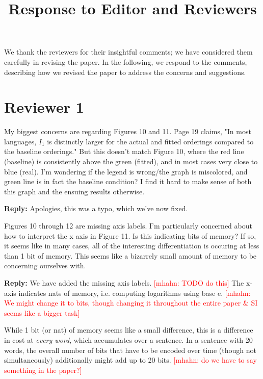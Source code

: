 \documentclass{article}[11pt,a4paper,oneside]
\title{Response to Editor and Reviewers}
\newcommand\mhahn[1]{\textcolor{red}{[mhahn: #1]}}
\newenvironment{reply}
  {\par\medskip
   \color{blue}%
   \begin{framed}
   \textbf{Reply: }\ignorespaces}
 {\end{framed}
  \medskip}
\begin{document}
\maketitle

We thank the reviewers for their insightful comments; we have considered them carefully in revising the paper. In the following, we respond to the comments, describing how we revised the paper to address the concerns and suggestions.



\section{Reviewer 1}



My biggest concerns are regarding Figures 10 and 11. Page 19 claims, "In most languages, $I_1$ is distinctly larger for the actual and fitted orderings compared to the baseline orderings." But this doesn't match Figure 10, where the red line (baseline) is consistently above the green (fitted), and in most cases very close to blue (real). I'm wondering if the legend is wrong/the graph is miscolored, and green line is in fact the baseline condition? I find it hard to make sense of both this graph and the ensuing results otherwise.

\begin{reply}
Apologies, this was a typo, which we've now fixed.
\end{reply}

Figures 10 through 12 are missing axis labels. I'm particularly concerned about how to interpret the x axis in Figure 11. Is this indicating bits of memory? If so, it seems like in many cases, all of the interesting differentiation is occuring at less than 1 bit of memory. This seems like a bizarrely small amount of memory to be concerning ourselves with.

\begin{reply}
We have added the missing axis labels. \mhahn{TODO do this}
The x-axis indicates nats of memory, i.e. computing logarithms using base e.
	\mhahn{We might change it to bits, though changing it throughout the entire paper \& SI seems like a bigger task}

	While 1 bit (or nat) of memory seems like a small difference, this is a difference in cost at \emph{every word}, which accumulates over a sentence.
	In a sentence with 20 words, the overall number of bits that have to be encoded over time (though not simultaneously) additionally might add up to 20 bits.
	\mhahn{do we have to say something in the paper?}
\end{reply}
\end{document}
